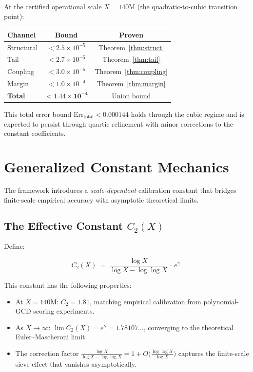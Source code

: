 \documentclass[11pt]{article}
\begin{document}
At the certified operational scale $X = 140\mathrm{M}$ (the quadratic-to-cubic
transition point):

{\centering
\begin{tabular}{lcc}
\toprule
Channel & Bound & Proven \\
\midrule
Structural & $< 2.5 \times 10^{-5}$ & Theorem~\ref{thm:struct} \\
Tail & $< 2.7 \times 10^{-5}$ & Theorem~\ref{thm:tail} \\
Coupling & $< 3.0 \times 10^{-5}$ & Theorem~\ref{thm:coupling} \\
Margin & $< 1.0 \times 10^{-4}$ & Theorem~\ref{thm:margin} \\
\midrule
\textbf{Total} & $\mathbf{< 1.44 \times 10^{-4}}$ & Union bound \\
\bottomrule
\end{tabular}
\par}

\noindent This total error bound $\mathrm{Err}_\mathrm{total} < 0.000144$ holds
through the cubic regime and is expected to persist through quartic refinement
with minor corrections to the constant coefficients.

\section{Generalized Constant Mechanics}
\label{sec:constants}

The framework introduces a \emph{scale-dependent} calibration constant that
bridges finite-scale empirical accuracy with asymptotic theoretical limits.

\subsection{The Effective Constant $C_2(X)$}

Define:

\begin{equation}
C_2(X) \;=\; \frac{\log X}{\log X - \log\log X} \,\cdot\, e^\gamma.
\label{eq:c2}
\end{equation}

\noindent This constant has the following properties:

\begin{itemize}
  \item At $X = 140\mathrm{M}$: $C_2 = 1.81$, matching empirical calibration
        from polynomial-GCD scoring experiments.
  \item As $X \to \infty$: $\lim C_2(X) = e^\gamma = 1.78107\ldots$, converging
        to the theoretical Euler--Mascheroni limit.
  \item The correction factor $\frac{\log X}{\log X - \log\log X} = 1 + O\bigl(
        \frac{\log\log X}{\log X}\bigr)$ captures the finite-scale sieve effect
        that vanishes asymptotically.
\end{itemize}
\end{document}
